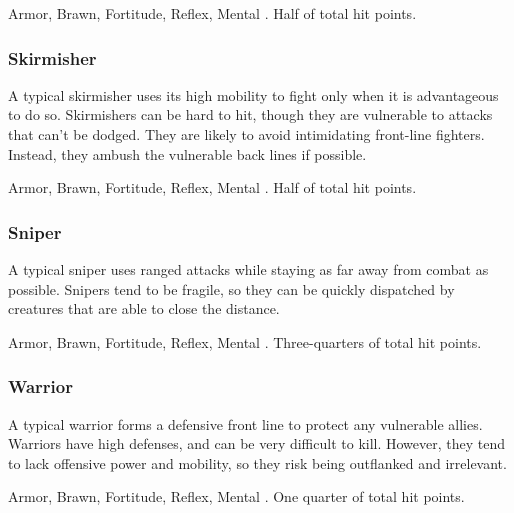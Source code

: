         Armor,  Brawn,  Fortitude,  Reflex,  Mental
       .
       Half of total hit points.

    \subsubsection{Skirmisher}
      A typical skirmisher uses its high mobility to fight only when it is advantageous to do so.
      Skirmishers can be hard to hit, though they are vulnerable to attacks that can't be dodged.
      They are likely to avoid intimidating front-line fighters.
      Instead, they ambush the vulnerable back lines if possible.

        Armor,  Brawn,  Fortitude,  Reflex,  Mental
       .
       Half of total hit points.

    \subsubsection{Sniper}
      A typical sniper uses ranged attacks while staying as far away from combat as possible.
      Snipers tend to be fragile, so they can be quickly dispatched by creatures that are able to close the distance.

        Armor,  Brawn,  Fortitude,  Reflex,  Mental
       .
       Three-quarters of total hit points.

    \subsubsection{Warrior}
      A typical warrior forms a defensive front line to protect any vulnerable allies.
      Warriors have high defenses, and can be very difficult to kill.
      However, they tend to lack offensive power and mobility, so they risk being outflanked and irrelevant.

        Armor,  Brawn,  Fortitude,  Reflex,  Mental
       .
       One quarter of total hit points.

